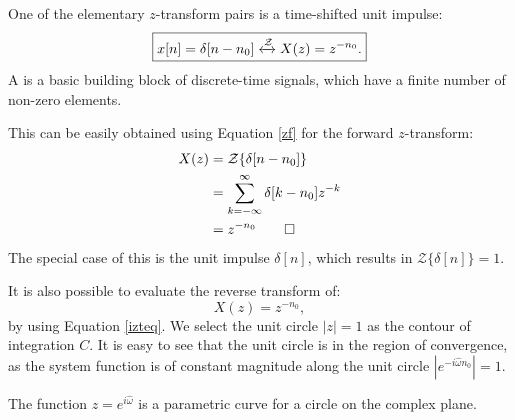 One of the elementary $z$-transform pairs is a time-shifted unit impulse:
\begin{equation}
  \boxed{
    x[n]=\delta[n-n_0] \xleftrightarrow{\mathcal{Z}} X(z) = z^{-n_0}.
    \label{eq:z_shifted_unit_impulse}
  }
\end{equation}
A  is a
basic building block of discrete-time signals, which have a finite
number of non-zero elements.

This can be easily obtained using Equation \ref{zf} for the forward $z$-transform:
\begin{align}
  X(z) & = \mathcal{Z}\{\delta[n-n_0]\}                   \\
       & = \sum_{k=-\infty}^{\infty} \delta[k-n_0] z^{-k} \\
       & = z^{-n_0}\qed
\end{align}
The special case of this is the unit impulse $\delta[n]$, which
results in $\mathcal{Z}\{\delta[n]\}=1$.


It is also possible to evaluate the reverse transform of:
\begin{equation}
  X(z)=z^{-n_0},
\end{equation}
by using Equation \ref{izteq}. We select the unit circle $|z|=1$ as
the contour of integration $C$. It is easy to see that the unit circle
is in the region of convergence, as the system function is of constant
magnitude along the unit circle $|e^{-i\hat{\omega}n_0}|=1$.

\begin{marginfigure}
  \begin{center}
  \end{center}
  \caption{The function $z=e^{i\hat{\omega}}$ is a parametric curve for a circle on the complex plane.}
\end{marginfigure}

